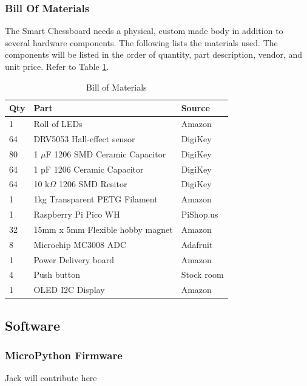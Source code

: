\documentclass[11pt,journal]{IEEEtran}
\begin{document}
\subsubsection{Bill Of Materials}
The Smart Chessboard needs a physical, custom made body in addition to several hardware components. The following lists the materials used. The components will be listed in the order of quantity, part description, vendor, and unit price. Refer to Table \ref{bomtable}.
\begin{center}
\begin{table}[ht]
\caption{Bill of Materials}
\begin{tabular}{|l|l|l|}
\hline
\textbf{Qty} & \textbf{Part}                        & \textbf{Source} \\ \hline
1            & Roll of LEDs                         & Amazon          \\ \hline
64           & DRV5053 Hall-effect sensor           & DigiKey         \\ \hline
80           & 1 $\mu$F 1206 SMD Ceramic Capacitor  & DigiKey         \\ \hline
64           & 1 pF 1206 Ceramic Capacitor          & DigiKey         \\ \hline
64           & 10 k$\Omega$ 1206 SMD Resitor        & DigiKey         \\ \hline
1            & 1kg Transparent PETG Filament        & Amazon          \\ \hline
1            & Raspberry Pi Pico WH                 & PiShop.us       \\ \hline
32           & 15mm x 5mm Flexible hobby magnet     & Amazon          \\ \hline
8            & Microchip MC3008 ADC                 & Adafruit        \\ \hline
1            & Power Delivery board                 & Amazon          \\ \hline
4            & Push button                          & Stock room      \\ \hline
1            & OLED I2C Display                     & Amazon          \\ \hline
\end{tabular}
\label{bomtable}
\end{table}
\end{center}
\subsection{Software}
\subsubsection{MicroPython Firmware}
Jack will contribute here
\end{document}
